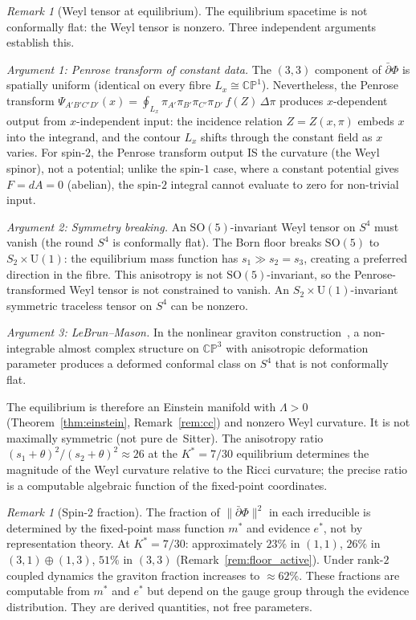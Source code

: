 \documentclass[11pt,a4paper]{article}
\theoremstyle{definition}
\theoremstyle{remark}
\newtheorem{remark}[theorem]{Remark}
\newcommand{\CP}{\mathbb{CP}}
\newcommand{\dbar}{\bar{\partial}}
\begin{document}
\begin{remark}[Weyl tensor at equilibrium]\label{rem:weyl}
The equilibrium spacetime is not conformally flat: the Weyl tensor is nonzero. Three independent arguments establish this.

\emph{Argument 1: Penrose transform of constant data.} The $(3,3)$ component of $\dbar\Phi$ is spatially uniform (identical on every fibre $L_x\cong\CP^1$). Nevertheless, the Penrose transform $\Psi_{A'B'C'D'}(x)=\oint_{L_x}\pi_{A'}\pi_{B'}\pi_{C'}\pi_{D'}\,f(Z)\,\Delta\pi$ produces $x$-dependent output from $x$-independent input: the incidence relation $Z=Z(x,\pi)$ embeds $x$ into the integrand, and the contour $L_x$ shifts through the constant field as $x$ varies. For spin-$2$, the Penrose transform output IS the curvature (the Weyl spinor), not a potential; unlike the spin-$1$ case, where a constant potential gives $F=dA=0$ (abelian), the spin-$2$ integral cannot evaluate to zero for non-trivial input.

\emph{Argument 2: Symmetry breaking.} An $\mathrm{SO}(5)$-invariant Weyl tensor on $S^4$ must vanish (the round $S^4$ is conformally flat). The Born floor breaks $\mathrm{SO}(5)$ to $S_2\times\mathrm{U}(1)$: the equilibrium mass function has $s_1\gg s_2=s_3$, creating a preferred direction in the fibre. This anisotropy is not $\mathrm{SO}(5)$-invariant, so the Penrose-transformed Weyl tensor is not constrained to vanish. An $S_2\times\mathrm{U}(1)$-invariant symmetric traceless tensor on $S^4$ can be nonzero.

\emph{Argument 3: LeBrun--Mason.} In the nonlinear graviton construction~\cite{LeBrunMason}, a non-integrable almost complex structure on $\CP^3$ with anisotropic deformation parameter produces a deformed conformal class on $S^4$ that is not conformally flat.

The equilibrium is therefore an Einstein manifold with $\Lambda>0$ (Theorem~\ref{thm:einstein}, Remark~\ref{rem:cc}) and nonzero Weyl curvature. It is not maximally symmetric (not pure de~Sitter). The anisotropy ratio $(s_1+\theta)^2/(s_2+\theta)^2\approx 26$ at the $K^*=7/30$ equilibrium determines the magnitude of the Weyl curvature relative to the Ricci curvature; the precise ratio is a computable algebraic function of the fixed-point coordinates.
\end{remark}

\begin{remark}[Spin-$2$ fraction]
The fraction of $\|\dbar\Phi\|^2$ in each irreducible is determined by the fixed-point mass function $m^*$ and evidence $e^*$, not by representation theory. At $K^*=7/30$: approximately $23\%$ in $(1,1)$, $26\%$ in $(3,1)\oplus(1,3)$, $51\%$ in $(3,3)$ (Remark~\ref{rem:floor_active}). Under rank-$2$ coupled dynamics the graviton fraction increases to $\approx 62\%$. These fractions are computable from $m^*$ and $e^*$ but depend on the gauge group through the evidence distribution. They are derived quantities, not free parameters.
\end{remark}
\end{document}
